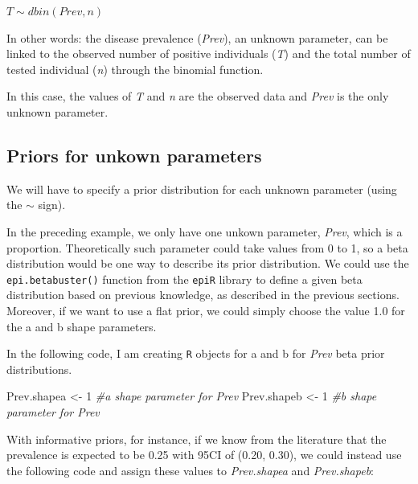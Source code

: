 \documentclass[
]{book}
\newenvironment{Shaded}{\begin{snugshade}}{\end{snugshade}}
\newcommand{\AttributeTok}[1]{\textcolor[rgb]{0.13,0.29,0.53}{#1}}
\newcommand{\CommentTok}[1]{\textcolor[rgb]{0.56,0.35,0.01}{\textit{#1}}}
\newcommand{\DecValTok}[1]{\textcolor[rgb]{0.00,0.00,0.81}{#1}}
\newcommand{\FloatTok}[1]{\textcolor[rgb]{0.00,0.00,0.81}{#1}}
\newcommand{\FunctionTok}[1]{\textcolor[rgb]{0.13,0.29,0.53}{\textbf{#1}}}
\newcommand{\NormalTok}[1]{#1}
\newcommand{\OtherTok}[1]{\textcolor[rgb]{0.56,0.35,0.01}{#1}}
\newcommand{\SpecialCharTok}[1]{\textcolor[rgb]{0.81,0.36,0.00}{\textbf{#1}}}
\newcommand{\StringTok}[1]{\textcolor[rgb]{0.31,0.60,0.02}{#1}}
\begin{document}
\(T \sim dbin(Prev, n)\)

In other words: the disease prevalence (\emph{Prev}), an unknown parameter, can be linked to the observed number of positive individuals (\emph{T}) and the total number of tested individual (\emph{n}) through the binomial function.

In this case, the values of \emph{T} and \emph{n} are the observed data and \emph{Prev} is the only unknown parameter.

\subsection{Priors for unkown parameters}\label{priors-for-unkown-parameters}

We will have to specify a prior distribution for each unknown parameter (using the \(\sim\) sign).

In the preceding example, we only have one unkown parameter, \emph{Prev}, which is a proportion. Theoretically such parameter could take values from 0 to 1, so a beta distribution would be one way to describe its prior distribution. We could use the \texttt{epi.betabuster()} function from the \texttt{epiR} library to define a given beta distribution based on previous knowledge, as described in the previous sections. Moreover, if we want to use a flat prior, we could simply choose the value 1.0 for the a and b shape parameters.

In the following code, I am creating \texttt{R} objects for a and b for \emph{Prev} beta prior distributions.

\begin{Shaded}
\begin{Highlighting}[]
\NormalTok{Prev.shapea }\OtherTok{\textless{}{-}} \DecValTok{1}         \CommentTok{\#a shape parameter for Prev    }
\NormalTok{Prev.shapeb }\OtherTok{\textless{}{-}} \DecValTok{1}         \CommentTok{\#b shape parameter for Prev }
\end{Highlighting}
\end{Shaded}

With informative priors, for instance, if we know from the literature that the prevalence is expected to be 0.25 with 95CI of (0.20, 0.30), we could instead use the following code and assign these values to \emph{Prev.shapea} and \emph{Prev.shapeb}:

\begin{Shaded}
\end{Shaded}
\end{document}
